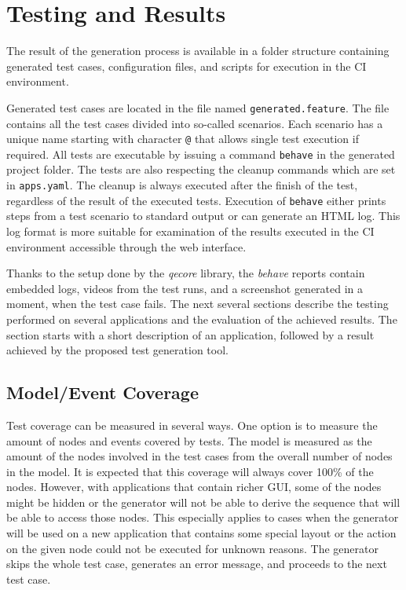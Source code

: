 

\chapter{Testing and Results}
The result of the generation process is available in a folder structure containing generated test cases, configuration files, and scripts for execution in the CI environment. 

Generated test cases are located in the file named \texttt{generated.feature}. The file contains all the test cases divided into so-called scenarios. Each scenario has a unique name starting with character \texttt{@} that allows single test execution if required. All tests are executable by issuing a command \texttt{behave} in the generated project folder. The tests are also respecting the cleanup commands which are set in \texttt{apps.yaml}. The cleanup is always executed after the finish of the test, regardless of the result of the executed tests. Execution of \texttt{behave} either prints steps from a test scenario to standard output or can generate an HTML log. This log format is more suitable for examination of the results executed in the CI environment accessible through the web interface. 

Thanks to the setup done by the \textit{qecore} library, the \textit{behave} reports contain embedded logs, videos from the test runs, and a screenshot generated in a moment, when the test case fails. The next several sections describe the testing performed on several applications and the evaluation of the achieved results. The section starts with a short description of an application, followed by a result achieved by the proposed test generation tool.  

\section{Model/Event Coverage}
Test coverage can be measured in several ways. One option is to measure the amount of nodes and events covered by tests. The model is measured as the amount of the nodes involved in the test cases from the overall number of nodes in the model. It is expected that this coverage will always cover 100\% of the nodes. However, with applications that contain richer GUI, some of the nodes might be hidden or the generator will not be able to derive the sequence that will be able to access those nodes. This especially applies to cases when the generator will be used on a new application that contains some special layout or the action on the given node could not be executed for unknown reasons. The generator skips the whole test case, generates an error message, and proceeds to the next test case. 

